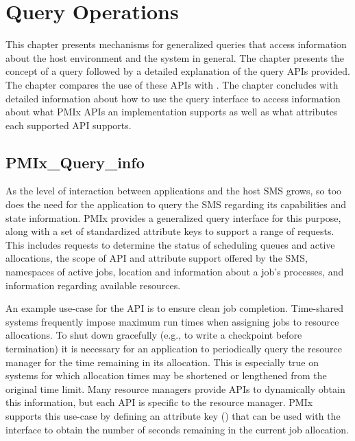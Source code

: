 \chapter{Query Operations}
\label{chap:api_proc_mgmt:query}

This chapter presents mechanisms for generalized queries that
access information about the host environment and the system in general.
The chapter presents the concept of a query followed by a detailed explanation
of the query \acp{API} provided.  The chapter compares the use of these \acp{API} with .  The chapter concludes with detailed information about how to use
the query interface to access information about what \ac{PMIx} \acp{API} an implementation supports as well as what attributes each supported \ac{API} supports.

\section{PMIx_Query_info}
As the level of interaction between applications and the host \ac{SMS} grows, so too does the need for the application to query the \ac{SMS} regarding its capabilities and state information. \ac{PMIx} provides a generalized query interface for this purpose, along with a set of standardized attribute keys to support a range of requests. This includes requests to determine the status of scheduling queues and active allocations, the scope of \ac{API} and attribute support offered by the \ac{SMS}, namespaces of active jobs, location and information about a job's processes, and information regarding available resources.

An example use-case for the  \ac{API} is to ensure clean job completion. Time-shared systems frequently impose maximum run times when assigning jobs to resource allocations. To shut down gracefully (e.g., to write a checkpoint before termination) it is necessary for an application to periodically query the resource manager for the time remaining in its allocation. This is especially true on systems for which allocation times may be shortened or lengthened from the original time limit. Many resource managers provide \acp{API} to dynamically obtain this information, but each \ac{API} is specific to the resource manager.
\ac{PMIx} supports this use-case by defining an attribute key () that can be used with the  interface to obtain the number of seconds remaining in the current job allocation.

